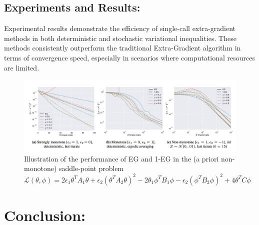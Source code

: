\documentclass[11pt]{article}
\begin{document}
	\subsection{Experiments and Results:}
 
        Experimental results demonstrate the efficiency of single-call extra-gradient methods in both deterministic and stochastic variational inequalities. These methods consistently outperform the traditional Extra-Gradient algorithm in terms of convergence speed, especially in scenarios where computational resources are limited.
        \begin{figure}[h]
            \centering
            \includegraphics[scale=0.5]{pictures/pic1.png}
            \caption{Illustration of the performance of EG and 1-EG in the (a priori non-monotone) saddle-point problem $\mathcal{L}(\theta, \phi) = 2 \epsilon_1 \theta^T A_1 \theta + \epsilon_2 (\theta^T A_2 \theta)^2 - 2 \theta_1 \phi^T B_1 \phi - \epsilon_2 (\phi^T B_2 \phi)^2 + 4\theta^T C \phi$ }
            \label{fig:label}
        \end{figure}
 
	
\section{Conclusion:}
\end{document}
